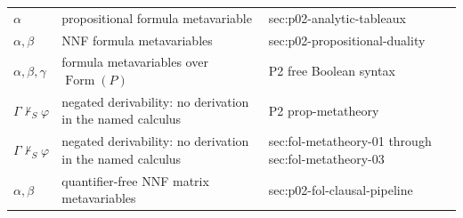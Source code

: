 \begin{longtable}{@{}p{}p{}p{}@{}}
\(\alpha\) & propositional formula metavariable & sec:\allowbreak{}p02-\allowbreak{}analytic-\allowbreak{}tableaux \\
\(\alpha,\allowbreak \beta\) & NNF formula metavariables & sec:\allowbreak{}p02-\allowbreak{}propositional-\allowbreak{}duality \\
\(\alpha,\allowbreak \beta,\allowbreak \gamma\) & formula metavariables over \(\operatorname{Form}(P)\) & P2 free Boolean syntax \\
\(\Gamma\nvdash_{S}\varphi\) & negated derivability: no derivation in the named calculus & P2 prop-\allowbreak{}metatheory \\
\(\Gamma\nvdash_{S}\varphi\) & negated derivability: no derivation in the named calculus & sec:\allowbreak{}fol-\allowbreak{}metatheory-\allowbreak{}01 through sec:\allowbreak{}fol-\allowbreak{}metatheory-\allowbreak{}03 \\
\(\alpha,\allowbreak \beta\) & quantifier-free NNF matrix metavariables & sec:\allowbreak{}p02-\allowbreak{}fol-\allowbreak{}clausal-\allowbreak{}pipeline \\
\end{longtable}
\endgroup

